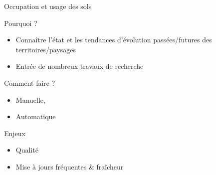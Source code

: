 \documentclass[pressentation,10pt,aspectratio=1610, xcolor=table]{beamer}
\begin{document}
\begin{frame}[fragile,label={sec:org7d22c4f}]{Occupation et usage des sols}
\begin{block}{Pourquoi ?}
\begin{itemize}
\item Connaître l'état et les tendances d'évolution passées/futures des territoires/paysages
\item Entrée de nombreux travaux de recherche
\end{itemize}
\end{block}
\begin{block}{Comment faire ?}
\begin{itemize}
\item Manuelle,
\item Automatique
\end{itemize}
\end{block}
\begin{block}{Enjeux}
\begin{itemize}
\item Qualité
\item Mise à jours fréquentes \& fraîcheur
\end{itemize}
\end{block}
\end{frame}
\end{document}
